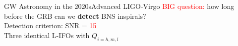 \documentclass[xcolor=dvipsnames,t]{beamer}
\newcommand{\red}[1]{\textcolor{red}{#1}}
\newcommand{\f}{\frac}
\begin{document}
\begin{frame}{GW Astronomy in the 2020s}{Advanced LIGO-Virgo}
  \red{BIG question:} how long before the GRB can we {\bf detect} BNS inspirals?\\
  Detection criterion: SNR = \red{15} \\ %
  Three identical L-IFOs with $Q_{i=h,m,l}$
 
\end{frame}
\end{document}
